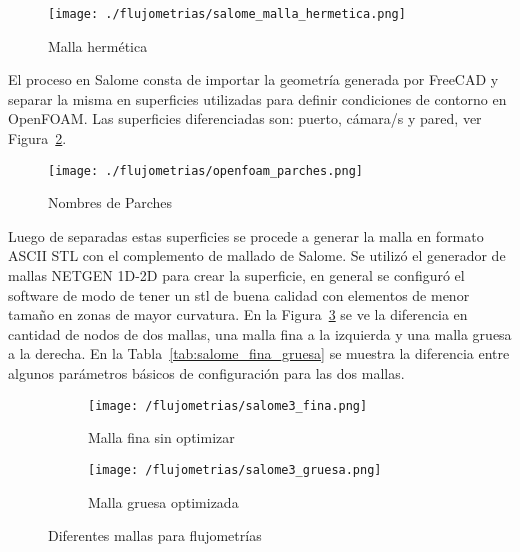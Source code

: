 \begin{figure}[ht]
    \centering
    \texttt{[image: ./flujometrias/salome\_malla\_hermetica.png]}
    \caption{Malla hermética}\label{fig:salome_malla_hermetica}
\end{figure}

El proceso en Salome consta de importar la geometría generada por FreeCAD y
separar la misma en superficies utilizadas para definir condiciones de contorno
en OpenFOAM.
%
Las superficies diferenciadas son: puerto, cámara/s y pared, ver
Figura~\ref{fig:openfoam_parches}.

\begin{figure}[ht]
    \centering
    \texttt{[image: ./flujometrias/openfoam\_parches.png]}
    \caption{Nombres de Parches}\label{fig:openfoam_parches}
\end{figure}

Luego de separadas estas superficies se procede a generar la malla en formato
ASCII STL con el complemento de mallado de Salome.
%
Se utilizó el generador de mallas NETGEN 1D-2D para crear la superficie, en
general se configuró el software de modo de tener un stl de buena calidad con
elementos de menor tamaño en zonas de mayor curvatura.
%
En la Figura~\ref{fig:salome_fina_gruesa} se ve la diferencia en cantidad de
nodos de dos mallas, una malla fina a la izquierda y una malla gruesa a la
derecha.
%
En la Tabla~\ref{tab:salome_fina_gruesa} se muestra la diferencia entre algunos
parámetros básicos de configuración para las dos mallas.
%

\begin{figure}[t!]
    \centering
    \begin{subfigure}[t]{0.5\textwidth}
        \centering
        \texttt{[image: /flujometrias/salome3\_fina.png]}
        \caption{Malla fina sin optimizar}
    \end{subfigure}%
    \begin{subfigure}[t]{0.5\textwidth}
        \centering
        \texttt{[image: /flujometrias/salome3\_gruesa.png]}
        \caption{Malla gruesa optimizada}
    \end{subfigure}
    \caption{Diferentes mallas para flujometrías}\label{fig:salome_fina_gruesa}
\end{figure}

